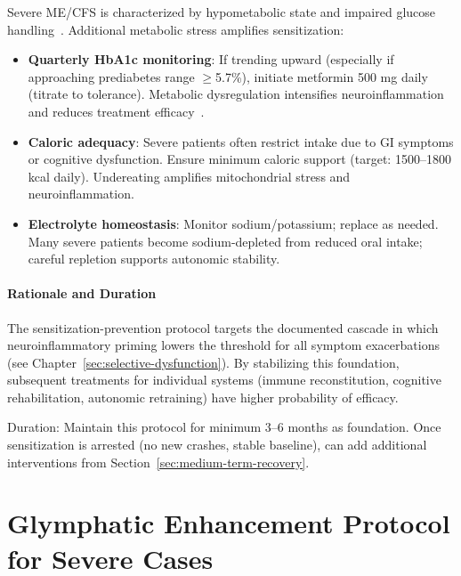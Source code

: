 \begin{protocol}
Severe ME/CFS is characterized by hypometabolic state and impaired glucose handling~\cite{MCMC2024Neurometabolic}. Additional metabolic stress amplifies sensitization:
\begin{itemize}
    \item \textbf{Quarterly HbA1c monitoring}: If trending upward (especially if approaching prediabetes range $\geq$5.7\%), initiate metformin 500 mg daily (titrate to tolerance). Metabolic dysregulation intensifies neuroinflammation and reduces treatment efficacy~\cite{MCMC2024Neurometabolic}.

    \item \textbf{Caloric adequacy}: Severe patients often restrict intake due to GI symptoms or cognitive dysfunction. Ensure minimum caloric support (target: 1500--1800 kcal daily). Undereating amplifies mitochondrial stress and neuroinflammation.

    \item \textbf{Electrolyte homeostasis}: Monitor sodium/potassium; replace as needed. Many severe patients become sodium-depleted from reduced oral intake; careful repletion supports autonomic stability.
\end{itemize}

\paragraph{Rationale and Duration}

The sensitization-prevention protocol targets the documented cascade in which neuroinflammatory priming lowers the threshold for all symptom exacerbations (see Chapter~\ref{sec:selective-dysfunction}). By stabilizing this foundation, subsequent treatments for individual systems (immune reconstitution, cognitive rehabilitation, autonomic retraining) have higher probability of efficacy.

Duration: Maintain this protocol for minimum 3--6 months as foundation. Once sensitization is arrested (no new crashes, stable baseline), can add additional interventions from Section~\ref{sec:medium-term-recovery}.

\end{protocol}

\section{Glymphatic Enhancement Protocol for Severe Cases}
\label{sec:glymphatic-enhancement-severe}

